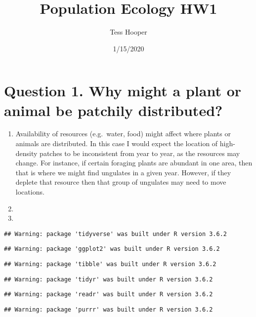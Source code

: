 \documentclass[
]{article}
\title{Population Ecology HW1}
\author{Tess Hooper}
\date{1/15/2020}
\begin{document}
\maketitle

\hypertarget{question-1.-why-might-a-plant-or-animal-be-patchily-distributed}{%
\section{Question 1. Why might a plant or animal be patchily
distributed?}\label{question-1.-why-might-a-plant-or-animal-be-patchily-distributed}}

\begin{enumerate}
\def\labelenumi{\arabic{enumi}.}
\item
  Availability of resources (e.g.~water, food) might affect where plants
  or animals are distributed. In this case I would expect the location
  of high-density patches to be inconsistent from year to year, as the
  resources may change. For instance, if certain foraging plants are
  abundant in one area, then that is where we might find ungulates in a
  given year. However, if they deplete that resource then that group of
  ungulates may need to move locations.
\item
\item
\end{enumerate}

\begin{verbatim}
## Warning: package 'tidyverse' was built under R version 3.6.2
\end{verbatim}

\begin{verbatim}
## Warning: package 'ggplot2' was built under R version 3.6.2
\end{verbatim}

\begin{verbatim}
## Warning: package 'tibble' was built under R version 3.6.2
\end{verbatim}

\begin{verbatim}
## Warning: package 'tidyr' was built under R version 3.6.2
\end{verbatim}

\begin{verbatim}
## Warning: package 'readr' was built under R version 3.6.2
\end{verbatim}

\begin{verbatim}
## Warning: package 'purrr' was built under R version 3.6.2
\end{verbatim}
\end{document}
